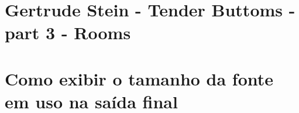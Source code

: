 %
%

\lang
{\chapter[Sample example]{Gertrude Stein - Tender Buttoms - part 3 - Rooms}}
{\chapter[Anexo exemplo]{Como exibir o tamanho da fonte em uso na saída final}}


